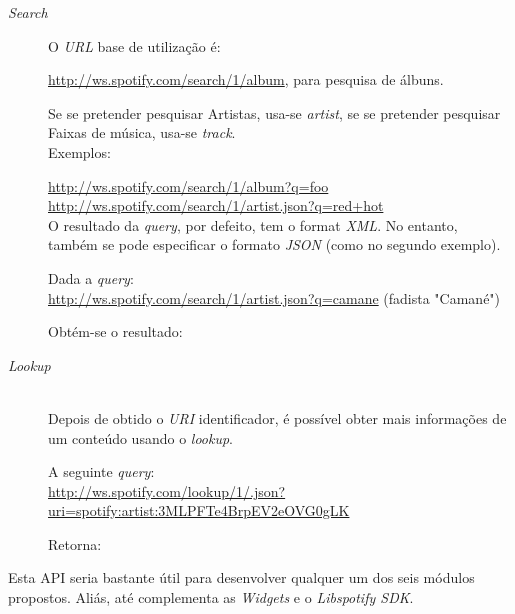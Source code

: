       \begin{description}
        \item[\emph{Search}] \hfill

          O \emph{URL} base de utilização é:

          \url{http://ws.spotify.com/search/1/album}, para pesquisa de álbuns.

          Se se pretender pesquisar Artistas, usa-se \emph{artist}, se se pretender pesquisar Faixas de música, usa-se \emph{track}. \\

          Exemplos:

          \url{http://ws.spotify.com/search/1/album?q=foo} \\
          \url{http://ws.spotify.com/search/1/artist.json?q=red+hot} \\

          O resultado da \emph{query}, por defeito, tem o format \emph{XML}. No entanto, também se pode especificar o formato \emph{JSON} (como no segundo exemplo).

          Dada a \emph{query}: \\
          \url{http://ws.spotify.com/search/1/artist.json?q=camane} (fadista "Camané")

          Obtém-se o resultado:

          

        \item[\emph{Lookup}] \hfill \\
          Depois de obtido o \emph{URI} identificador, é possível obter mais informações de um conteúdo usando o \emph{lookup}.

          A seguinte \emph{query}: \\
          \url{http://ws.spotify.com/lookup/1/.json?uri=spotify:artist:3MLPFTe4BrpEV2eOVG0gLK}

          Retorna:

          

      \end{description}

      Esta API seria bastante útil para desenvolver qualquer um dos seis módulos propostos.
      Aliás, até complementa as \emph{Widgets} e o \emph{Libspotify SDK}.


